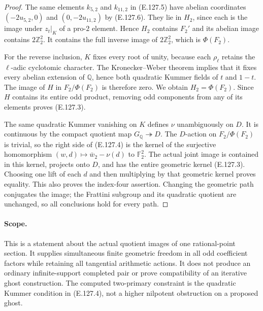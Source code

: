 \begin{proof}
The same elements $k_{5,2}$ and $k_{11,2}$ in
(E.127.5) have abelian coordinates
$(-2u_{5,2},0)$ and $(0,-2u_{11,2})$ by (E.127.6).
They lie in $H_2$, since each is the image under $z_t|_K$
of a pro-$2$ element.  Hence $H_2$ contains $F_2'$ and
its abelian image contains $2\mathbb Z_2^2$.  It contains
the full inverse image of $2\mathbb Z_2^2$, which is
$\Phi(F_2)$.

For the reverse inclusion, $K$ fixes every root of unity,
because each $\rho_\ell$ retains the $\ell$-adic
cyclotomic character.  The Kronecker--Weber theorem
\cite[I, Theorem~4.16, pp.49--50]{RootMilneCFT} implies
that it fixes every abelian extension of $\mathbb Q$,
hence both quadratic Kummer fields of $t$ and $1-t$.
The image of $H$ in $F_2/\Phi(F_2)$ is therefore zero.
We obtain $H_2=\Phi(F_2)$.  Since $H$ contains its entire
odd product, removing odd components from any of its
elements proves (E.127.3).

The same quadratic Kummer vanishing on $K$ defines
$\nu$ unambiguously on $D$.  It is continuous by the
compact quotient map $G_{\mathbb Q}\twoheadrightarrow D$.
The $D$-action on $F_2/\Phi(F_2)$ is trivial, so the
right side of (E.127.4) is the kernel of the surjective
homomorphism $(w,d)\mapsto\bar w_2-\nu(d)$ to
$\mathbb F_2^2$.  The actual joint image is contained
in this kernel, projects onto $D$, and has the entire
geometric kernel (E.127.3).  Choosing one lift of each
$d$ and then multiplying by that geometric kernel proves
equality.  This also proves the index-four assertion.
Changing the geometric path conjugates the image;
the Frattini subgroup and its quadratic quotient are
unchanged, so all conclusions hold for every path.
\end{proof}

\paragraph{Scope.}
This is a statement about the actual quotient images of
one rational-point section.  It supplies simultaneous
finite geometric freedom in all odd coefficient factors
while retaining all tangential arithmetic actions.  It
does not produce an ordinary infinite-support completed
pair or prove compatibility of an iterative ghost
construction.  The computed two-primary constraint is the quadratic
Kummer condition in (E.127.4), not a higher nilpotent
obstruction on a proposed ghost.
